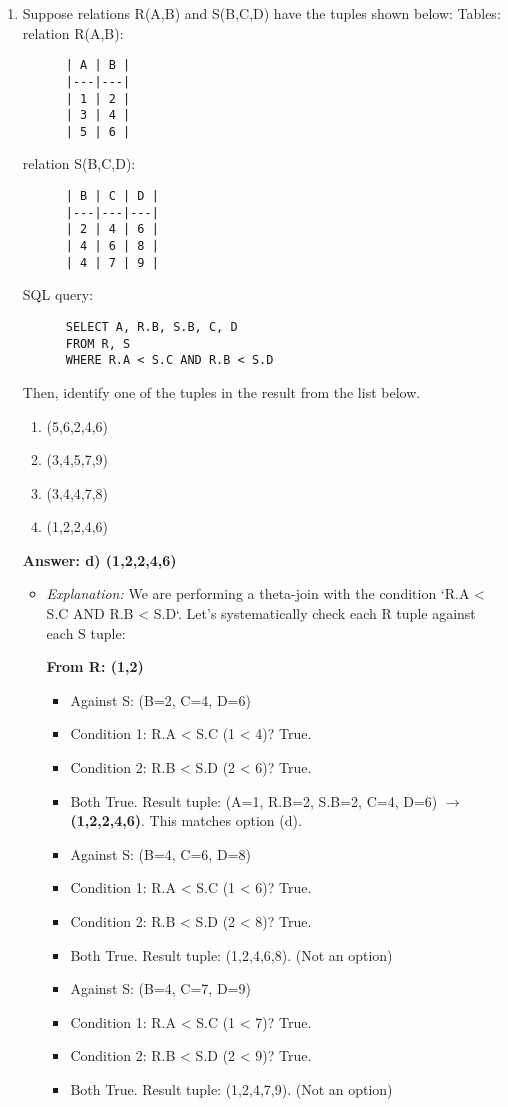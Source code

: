 \documentclass{article}
\begin{document}
\begin{enumerate}[label=\textbf{Question \arabic*.}]
\item Suppose relations R(A,B) and S(B,C,D) have the tuples shown below:
    Tables:
    relation R(A,B):
    \begin{verbatim}
      | A | B |
      |---|---|
      | 1 | 2 |
      | 3 | 4 |
      | 5 | 6 |
    \end{verbatim}
    relation S(B,C,D):
    \begin{verbatim}
      | B | C | D |
      |---|---|---|
      | 2 | 4 | 6 |
      | 4 | 6 | 8 |
      | 4 | 7 | 9 |
    \end{verbatim}
    SQL query:
    \begin{lstlisting}
      SELECT A, R.B, S.B, C, D
      FROM R, S
      WHERE R.A < S.C AND R.B < S.D
    \end{lstlisting}
    Then, identify one of the tuples in the result from the list below.
    \begin{enumerate}[label=\alph*)]
        \item (5,6,2,4,6)
        \item (3,4,5,7,9)
        \item (3,4,4,7,8)
        \item (1,2,2,4,6)
    \end{enumerate}
    \textbf{Answer: d) (1,2,2,4,6)}
    \begin{itemize}
        \item \textit{Explanation:} We are performing a theta-join with the condition `R.A < S.C AND R.B < S.D`.
        Let's systematically check each R tuple against each S tuple:

        \textbf{From R: (1,2)}
        \begin{itemize}
            \item Against S: (B=2, C=4, D=6)
                \item Condition 1: R.A < S.C (1 < 4)? True.
                \item Condition 2: R.B < S.D (2 < 6)? True.
                \item Both True. Result tuple: (A=1, R.B=2, S.B=2, C=4, D=6) $\rightarrow$ \textbf{(1,2,2,4,6)}. This matches option (d).
            \item Against S: (B=4, C=6, D=8)
                \item Condition 1: R.A < S.C (1 < 6)? True.
                \item Condition 2: R.B < S.D (2 < 8)? True.
                \item Both True. Result tuple: (1,2,4,6,8). (Not an option)
            \item Against S: (B=4, C=7, D=9)
                \item Condition 1: R.A < S.C (1 < 7)? True.
                \item Condition 2: R.B < S.D (2 < 9)? True.
                \item Both True. Result tuple: (1,2,4,7,9). (Not an option)
        \end{itemize}


\end{itemize}
\end{enumerate}
\end{document}
